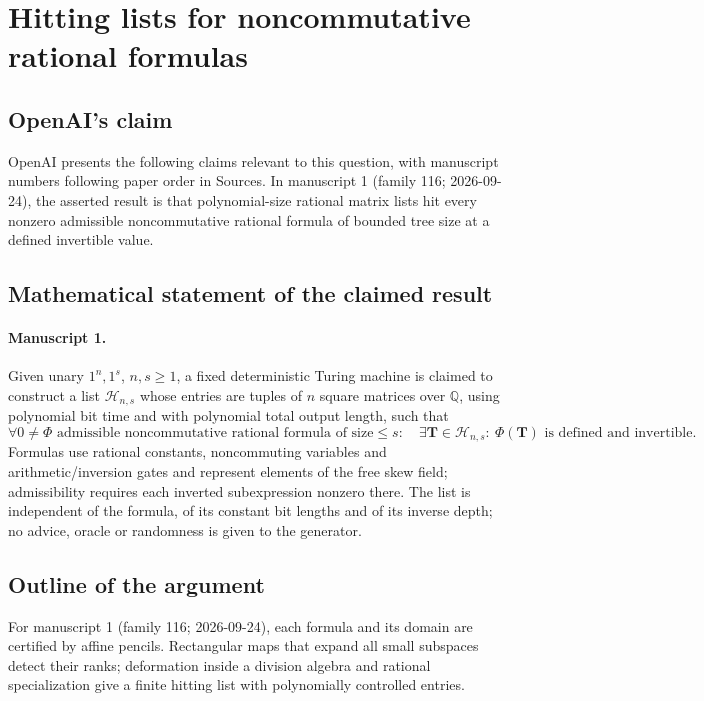 \documentclass[11pt]{article}
\begin{document}
\section*{Hitting lists for noncommutative rational formulas}

\subsection{OpenAI's claim}
OpenAI presents the following claims relevant to this question, with manuscript numbers following paper order in Sources. In manuscript 1 (family 116; 2026-09-24), the asserted result is that polynomial-size rational matrix lists hit every nonzero admissible noncommutative rational formula of bounded tree size at a defined invertible value.

\subsection{Mathematical statement of the claimed result}
\paragraph{Manuscript 1.}
Given unary $1^n,1^s$, $n,s\ge1$, a fixed deterministic Turing machine is claimed to construct a list $\mathcal H_{n,s}$ whose entries are tuples of $n$ square matrices over $\mathbb Q$, using polynomial bit time and with polynomial total output length, such that
\[
 \forall0\ne\Phi\text{ admissible noncommutative rational formula of size}\le s:
 \quad\exists\mathbf T\in\mathcal H_{n,s}:\ \Phi(\mathbf T)\text{ is defined and invertible}.
\]
Formulas use rational constants, noncommuting variables and arithmetic/inversion gates and represent elements of the free skew field; admissibility requires each inverted subexpression nonzero there. The list is independent of the formula, of its constant bit lengths and of its inverse depth; no advice, oracle or randomness is given to the generator.

\subsection{Outline of the argument}
For manuscript 1 (family 116; 2026-09-24), each formula and its domain are certified by affine pencils. Rectangular maps that expand all small subspaces detect their ranks; deformation inside a division algebra and rational specialization give a finite hitting list with polynomially controlled entries.
\end{document}
